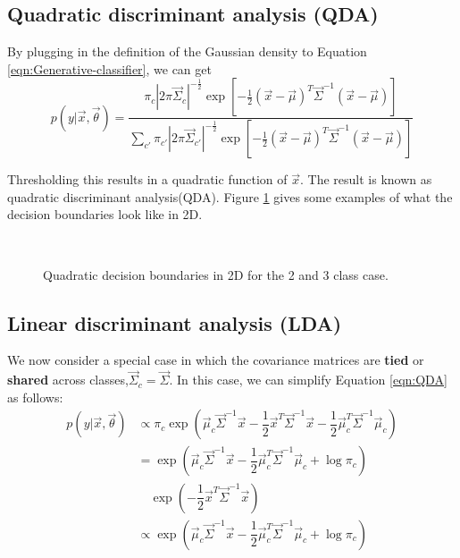 \subsection{Quadratic discriminant analysis (QDA)}
By plugging in the definition of the Gaussian density to Equation \ref{eqn:Generative-classifier}, we can get
\begin{equation}\label{eqn:QDA}
p(y|\vec{x},\vec{\theta})=\dfrac{\pi_c|2\pi\vec{\Sigma}_c|^{-\frac{1}{2}}\exp\left[-\frac{1}{2}(\vec{x}-\vec{\mu})^T\vec{\Sigma}^{-1}(\vec{x}-\vec{\mu})\right]}{\sum_{c'}\pi_{c'}|2\pi\vec{\Sigma}_{c'}|^{-\frac{1}{2}}\exp\left[-\frac{1}{2}(\vec{x}-\vec{\mu})^T\vec{\Sigma}^{-1}(\vec{x}-\vec{\mu})\right]}
\end{equation}

Thresholding this results in a quadratic function of $\vec{x}$. The result is known as quadratic discriminant analysis(QDA). Figure \ref{fig:QDA} gives some examples of what the decision boundaries look like in 2D.

\begin{figure}[hbtp]
\centering
{} \\
\caption{Quadratic decision boundaries in 2D for the 2 and 3 class case.}
\label{fig:QDA} 
\end{figure}


\subsection{Linear discriminant analysis (LDA)}
\label{sec:Linear-discriminant-analysis}
We now consider a special case in which the covariance matrices are \textbf{tied} or \textbf{shared} across classes,$\vec{\Sigma}_c=\vec{\Sigma}$. In this case, we can simplify Equation \ref{eqn:QDA} as follows:
\begin{align}
p(y|\vec{x},\vec{\theta})& \propto \pi_c\exp\left(\vec{\mu}_c\vec{\Sigma}^{-1}\vec{x}-\dfrac{1}{2}\vec{x}^T\vec{\Sigma}^{-1}\vec{x}-\dfrac{1}{2}\vec{\mu}_c^T\vec{\Sigma}^{-1}\vec{\mu}_c\right) \nonumber \\
 & =\exp\left(\vec{\mu}_c\vec{\Sigma}^{-1}\vec{x}-\dfrac{1}{2}\vec{\mu}_c^T\vec{\Sigma}^{-1}\vec{\mu}_c+\log \pi_c\right) \nonumber \\
 & \quad \exp\left(-\dfrac{1}{2}\vec{x}^T\vec{\Sigma}^{-1}\vec{x}\right) \nonumber \\
 & \propto \exp\left(\vec{\mu}_c\vec{\Sigma}^{-1}\vec{x}-\dfrac{1}{2}\vec{\mu}_c^T\vec{\Sigma}^{-1}\vec{\mu}_c+\log \pi_c\right)
\end{align}


